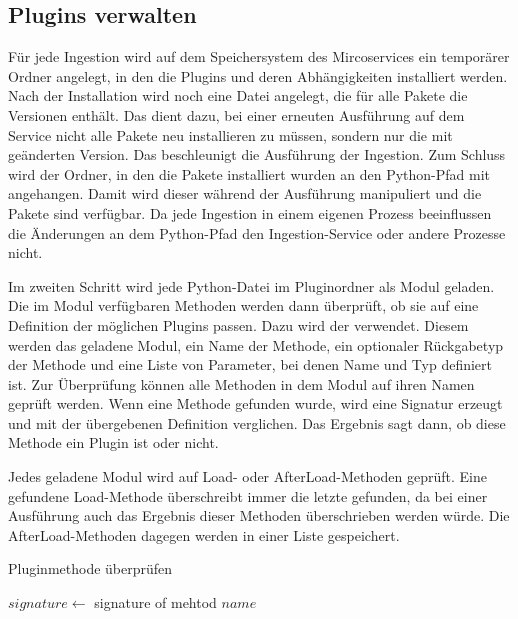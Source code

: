 \subsection{Plugins verwalten}
Für jede Ingestion wird auf dem Speichersystem des Mircoservices ein temporärer Ordner angelegt, in den die Plugins und deren Abhängigkeiten installiert werden.
Nach der Installation wird noch eine Datei angelegt, die für alle Pakete die Versionen enthält.
Das dient dazu, bei einer erneuten Ausführung auf dem Service nicht alle Pakete neu installieren zu müssen, sondern nur die mit geänderten Version.
Das beschleunigt die Ausführung der Ingestion.
Zum Schluss wird der Ordner, in den die Pakete installiert wurden an den Python-Pfad mit angehangen.
Damit wird dieser während der Ausführung manipuliert und die Pakete sind verfügbar.
Da jede Ingestion in einem eigenen Prozess beeinflussen die Änderungen an dem Python-Pfad den Ingestion-Service oder andere Prozesse nicht.

Im zweiten Schritt wird jede Python-Datei im Pluginordner als Modul geladen.
Die im Modul verfügbaren Methoden werden dann überprüft, ob sie auf eine Definition der möglichen Plugins passen.
Dazu wird der  verwendet.
Diesem werden das geladene Modul, ein Name der Methode, ein optionaler Rückgabetyp der Methode und eine Liste von Parameter, bei denen Name und Typ definiert ist.
Zur Überprüfung können alle Methoden in dem Modul auf ihren Namen geprüft werden.
Wenn eine Methode gefunden wurde, wird eine Signatur erzeugt und mit der übergebenen Definition verglichen.
Das Ergebnis sagt dann, ob diese Methode ein Plugin ist oder nicht.

Jedes geladene Modul wird auf Load- oder AfterLoad-Methoden geprüft.
Eine gefundene Load-Methode überschreibt immer die letzte gefunden, da bei einer Ausführung auch das Ergebnis dieser Methoden überschrieben werden würde.
Die AfterLoad-Methoden dagegen werden in einer Liste gespeichert.


\begin{algorithm}
    \caption{Pluginmethode überprüfen}
    \label{algo:check-method}




    $signature \gets$ signature of mehtod $name$




\end{algorithm}

